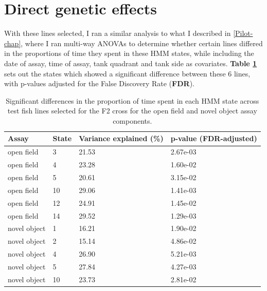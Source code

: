 \documentclass[
]{book}
\begin{document}
\hypertarget{direct-genetic-effects-1}{%
\section{Direct genetic effects}\label{direct-genetic-effects-1}}

With these lines selected, I ran a similar analysis to what I described in \ref{Pilot-chap}, where I ran multi-way ANOVAs to determine whether certain lines differed in the proportions of time they spent in these HMM states, while including the date of assay, time of assay, tank quadrant and tank side as covariates. \textbf{Table \ref{tab:mikk-dge-F0}} sets out the states which showed a significant difference between these 6 lines, with p-values adjusted for the False Discovery Rate (\textbf{FDR}).

\begin{table}

\caption{\label{tab:mikk-dge-F0}Significant differences in the proportion of time spent in each HMM state across test fish lines selected for the F2 cross for the open field and novel object assay components.}
\centering
\begin{tabular}[t]{l|l|l|l}
\hline
Assay & State & Variance explained (\%) & p-value (FDR-adjusted)\\
\hline
open field & 3 & 21.53 & 2.67e-03\\
\hline
open field & 4 & 23.28 & 1.60e-02\\
\hline
open field & 5 & 20.61 & 3.15e-02\\
\hline
open field & 10 & 29.06 & 1.41e-03\\
\hline
open field & 12 & 24.91 & 1.45e-02\\
\hline
open field & 14 & 29.52 & 1.29e-03\\
\hline
novel object & 1 & 16.21 & 1.90e-02\\
\hline
novel object & 2 & 15.14 & 4.86e-02\\
\hline
novel object & 4 & 26.90 & 5.21e-03\\
\hline
novel object & 5 & 27.84 & 4.27e-03\\
\hline
novel object & 10 & 23.73 & 2.81e-02\\
\hline
\end{tabular}
\end{table}
\end{document}

